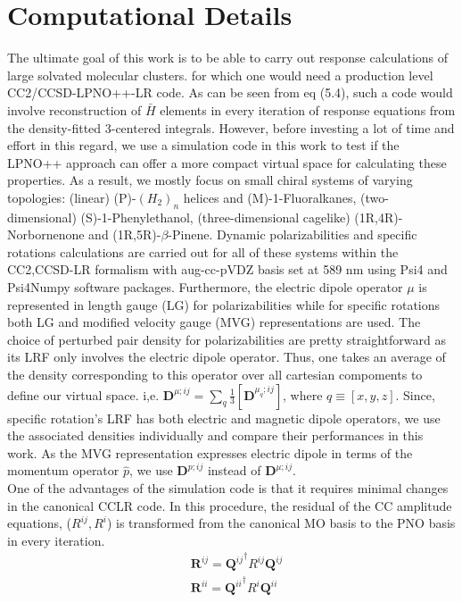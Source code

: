 \section{Computational Details}
The ultimate goal of this work is to be able to carry out response calculations of large solvated molecular clusters.
for which one would need a production level CC2/CCSD-LPNO++-LR code. As can be seen from eq (5.4), such a code would
involve reconstruction of $\bar{H}$ elements in every iteration of response equations from the density-fitted 
3-centered integrals. However, before investing a lot of time and effort in this regard, we use a simulation code in 
this work to test if the LPNO++ approach can offer a more compact virtual space for calculating these properties. 
As a result, we mostly focus on small chiral systems of varying topologies: (linear) (P)-$(H_2)_n$ helices and (M)-1-Fluoralkanes, 
(two-dimensional) (S)-1-Phenylethanol, (three-dimensional cagelike) (1R,4R)-Norbornenone and (1R,5R)-$\beta$-Pinene. 
Dynamic polarizabilities and specific rotations calculations are carried out for all of these systems within the CC2,CCSD-LR
formalism with aug-cc-pVDZ\cite{Dunning89,Kendall92,Woon94} basis set at 589 nm using Psi4 and Psi4Numpy software packages\cite{Parrish17,Smith18}.
Furthermore, the electric dipole operator $\mu$ is represented in length gauge (LG) for polarizabilities
while for specific rotations both LG and modified velocity gauge (MVG)\cite{Pedersen04} representations are used.
The choice of perturbed pair density for polarizabilities are pretty straightforward as its LRF only involves 
the electric dipole operator. Thus, one takes an average of the density corresponding to this operator over all cartesian 
compoments to define our virtual space. i,e. $ {\bm{D}^{\mu;ij}} = \sum\limits_q \frac{1}{3}[{\bm{D}^{\mu_q;ij}}]$,
where $q \equiv [x,y,z]$. Since, specific rotation's LRF has both electric and magnetic dipole operators, we use 
the associated densities individually and compare their performances in this work. As the MVG representation expresses
electric dipole in terms of the momentum operator $\hat{p}$, we use ${\bm{D}^{p;ij}}$ instead of ${\bm{D}^{\mu;ij}}$.\\
One of the advantages of the simulation code is that it requires minimal changes in the canonical CCLR code. In this
procedure, the residual of the CC amplitude equations, ($R^{ij}, R^{i}$) is transformed from the canonical MO basis to 
the PNO basis in every iteration.
\begin{equation}
\begin{split}
&\bm{R}^{ij} = {\bm{Q}^{ij}}^{\dagger} R^{ij} \bm{Q}^{ij}\\
&\bm{R}^{ii} = {\bm{Q}^{ii}}^{\dagger} R^{i} \bm{Q}^{ii}\\
\end{split}
\end{equation}
